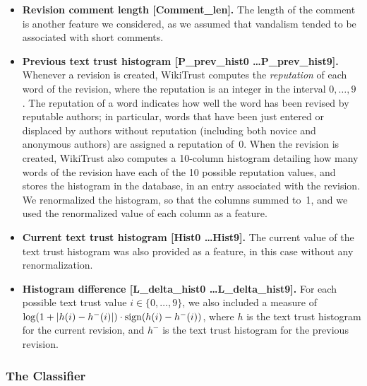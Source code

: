 \begin{itemize}
\item \textbf{Revision comment length [Comment\_len].}  The length of the comment is another feature we considered, as we assumed that vandalism tended to be associated with short comments.

\item \textbf{Previous text trust histogram [P\_prev\_hist0 \ldots P\_prev\_hist9].}
Whenever a revision is created, WikiTrust computes the {\em reputation\/} of each word of the revision, where the reputation is an integer in the interval $0, \ldots, 9$ \cite{WikiTrust08}.
The reputation of a word indicates how well the word has been revised by reputable authors; in particular, words that have been just entered or displaced by authors without reputation (including both novice and anonymous authors) are assigned a reputation of~0.
When the revision is created, WikiTrust also computes a 10-column histogram detailing how many words of the revision have each of the 10 possible reputation values, and stores the histogram in the database, in an entry associated with the revision.
We renormalized the histogram, so that the columns summed to~1, and we used the renormalized value of each column as a feature.

\item \textbf{Current text trust histogram [Hist0 \ldots Hist9].}  The current value of the text trust histogram was also provided as a feature, in this case without any renormalization.

\item \textbf{Histogram difference [L\_delta\_hist0 \ldots L\_delta\_hist9].}  For each possible text trust value $i \in \{0, \ldots, 9\}$, we also included a measure of $\log(1 + |h(i) - h^{-}(i)|) \cdot {{\textrm{sign}}}(h(i) - h^{-}(i))$, where $h$ is the text trust histogram for the current revision, and $h^{-}$ is the text trust histogram for the previous revision.

\end{itemize}
%
\subsubsection{The Classifier}


